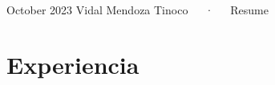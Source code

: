 \documentclass[11pt,a4paper,]{awesome-cv}
\begin{document}
\makecvheader

\makecvfooter
  {October 2023}
    { Vidal Mendoza Tinoco~~~·~~~Resume}
  {\thepage}





\hypertarget{experiencia}{%
\section{Experiencia}\label{experiencia}}
\end{document}
